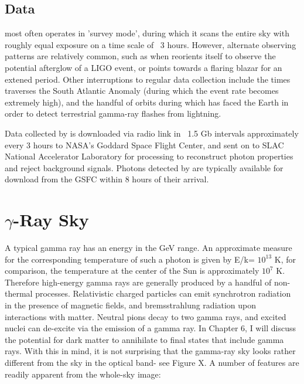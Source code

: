 \subsection{Data}
\Fermi most often operates in 'survey mode', during which it scans the entire sky with roughly equal exposure on a time scale of ~3 hours. However, alternate observing patterns are relatively common, such as when \Fermi reorients itself to observe the potential afterglow of a LIGO event, or points towards a flaring blazar for an extened period. Other interruptions to regular data collection include the times \Fermi traverses the South Atlantic Anomaly (during which the event rate becomes extremely high), and the handful of orbits during which \Fermi has faced the Earth in order to detect terrestrial gamma-ray flashes from lightning.

Data collected by \FermiLAT is downloaded via radio link in ~1.5 Gb intervals approximately every 3 hours to NASA's Goddard Space Flight Center, and sent on to SLAC National Accelerator Laboratory for processing to reconstruct photon properties and reject background signals. Photons detected by \FermiLAT are typically available for download from the GSFC within 8 hours of their arrival.

\section{$\gamma$-Ray Sky}
A typical \FermiLAT gamma ray has an energy in the GeV range. An approximate measure for the corresponding temperature of such a photon is given by E/k= $10^13$ K, for comparison, the temperature at the center of the Sun is approximately $10^7$ K. Therefore high-energy gamma rays are generally produced by a handful of non-thermal processes. Relativistic charged particles can emit synchrotron radiation in the presence of magnetic fields, and bremsstrahlung radiation upon interactions with matter. Neutral pions decay to two gamma rays, and excited nuclei can de-excite via the emission of a gamma ray. In Chapter 6, I will discuss the potential for dark matter to annihilate to final states that include gamma rays.
With this in mind, it is not surprising that the gamma-ray sky looks rather different from the sky in the optical band- see Figure X. A number of features are readily apparent from the whole-sky image:
